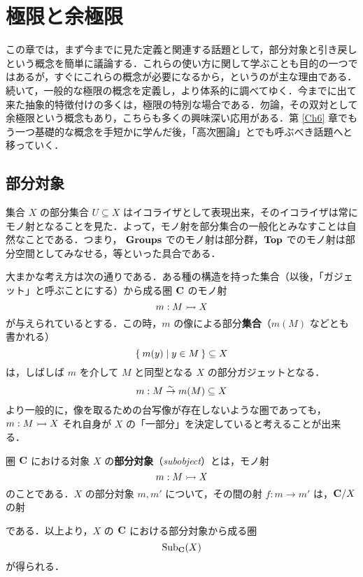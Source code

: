 \newcommand{\Sub}{\mathrm{Sub}}
\chapter{極限と余極限}
この章では，まず今までに見た定義と関連する話題として，部分対象と引き戻しという概念を簡単に議論する．これらの使い方に関して学ぶことも目的の一つではあるが，すぐにこれらの概念が必要になるから，というのが主な理由である．続いて，一般的な極限の概念を定義し，より体系的に調べてゆく．今までに出て来た抽象的特徴付けの多くは，極限の特別な場合である．勿論，その双対として余極限という概念もあり，こちらも多くの興味深い応用がある．第 \ref{Ch6} 章でもう一つ基礎的な概念を手短かに学んだ後，「高次圏論」とでも呼ぶべき話題へと移っていく．

\section{部分対象}
集合 $X$ の部分集合 $U \subseteq X$ はイコライザとして表現出来，そのイコライザは常にモノ射となることを見た．よって，モノ射を部分集合の一般化とみなすことは自然なことである．つまり， $\mathbf{Groups}$ でのモノ射は部分群，${\bf Top}$ でのモノ射は部分空間としてみなせる，等といった具合である．

大まかな考え方は次の通りである．ある種の構造を持った集合（以後，「ガジェット」と呼ぶことにする）から成る圏 ${\bf C}$ のモノ射
\[
 m: M \rightarrowtail X
\]
が与えられているとする．この時，$m$ の像による部分{\bfseries 集合}（$m(M)$ などとも書かれる）
\[
 \Set{m(y) | y \in M} \subseteq X
\]
は，しばしば $m$ を介して $M$ と同型となる $X$ の部分ガジェットとなる．
\[
 m: M \stackrel{\sim}{\to} m(M) \subseteq X
\]
より一般的に，像を取るための台写像が存在しないような圏であっても，$m: M \rightarrowtail X$ それ自身が $X$ の「一部分」を決定していると考えることが出来る．

\begin{definition}
 圏 ${\bf C}$ における対象 $X$ の{\bfseries 部分対象}（{\itshape subobject}）とは，モノ射
 \[
  m: M \rightarrowtail X
 \]
 のことである．$X$ の部分対象 $m, m'$ について，その間の射 $f: m \to m'$ は，${\bf C}/X$ の射
 \begin{center}
 \end{center}
 である．以上より，$X$ の ${\bf C}$ における部分対象から成る圏
 \[
  \Sub_{\bf C}(X)
 \]
 が得られる．
\end{definition}


